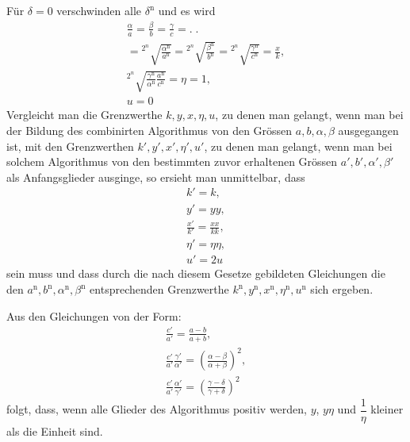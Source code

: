 Für $\delta=0$ verschwinden alle $\delta^{\mathrm n}$ und es wird
\[
\begin{gathered}\frac\alpha a=\frac\beta b=\frac\gamma c=.\;.
\\={}^{2^n}\!\surd{\frac{\alpha^{\mathrm n}}{a^{\mathrm n}}}
={}^{2^n}\!\surd{\frac{\beta^{\mathrm n}}{b^{\mathrm n}}}
={}^{2^n}\!\surd{\frac{\gamma^{\mathrm n}}{c^{\mathrm n}}}=\frac xk,\\[5pt]
{}^{2^n}\!\surd{\frac{\gamma^{\mathrm n}}{\alpha^{\mathrm n}}\frac{a^{\mathrm n}}{c^{\mathrm n}}}=\eta=1,\\[5pt] u=0\end{gathered}
\]
Vergleicht man die Grenzwerthe $k,\allowbreak y,\allowbreak x,\allowbreak \eta,\allowbreak u$, zu denen man gelangt, wenn
man bei der Bildung des combinirten Algorithmus von den Grössen $a,\allowbreak b,\allowbreak \alpha,\allowbreak \beta$
ausgegangen ist, mit den Grenzwerthen $k',\allowbreak y',\allowbreak x',\allowbreak \eta',\allowbreak u'$, zu denen man gelangt,
wenn man bei solchem Algorithmus von den bestimmten zuvor erhaltenen Grössen
$a',\allowbreak b',\allowbreak \alpha',\allowbreak \beta'$ als Anfangsglieder ausginge, so ersieht man unmittelbar, dass
\[
\begin{gathered}k'=k,\\[5pt] y'=yy,\\[5pt]\frac{x'}{k'}=\frac{xx}{kk},\\[5pt]
\eta'=\eta\eta,\\[5pt] u'=2u\end{gathered}
\]
sein muss und dass durch die nach diesem Gesetze gebildeten Gleichungen die
den $a^{\mathrm n},\allowbreak b^{\mathrm n},\allowbreak \alpha^{\mathrm n},\allowbreak \beta^{\mathrm n}$ entsprechenden Grenzwerthe $k^{\mathrm n},\allowbreak y^{\mathrm n},\allowbreak x^{\mathrm n},\allowbreak \eta^{\mathrm n},\allowbreak u^{\mathrm n}$ sich ergeben.

Aus den Gleichungen von der Form:
\[
\begin{gathered}\frac{c'}{a'}=\frac{a-b}{a+b},\\[5pt]
\frac{c'}{a'}\frac{\gamma'}{\alpha'}=\left(\frac{\alpha-\beta}{\alpha+\beta}\right)^2,\\[5pt]
\frac{c'}{a'}\frac{\alpha'}{\gamma'}=\left(\frac{\gamma-\delta}{\gamma+\delta}\right)^2\end{gathered}
\]
folgt, dass, wenn alle Glieder des Algorithmus positiv werden, $y$, $y\eta$ und
$\dfrac1\eta$ kleiner als die Einheit sind.

